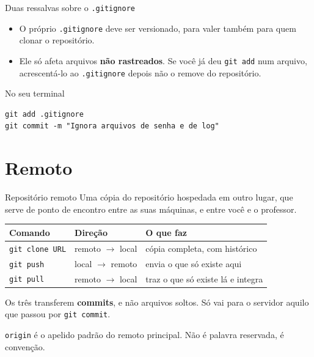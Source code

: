 \documentclass{beamer}
\newenvironment{noterminal}
  {\begin{exampleblock}{No seu terminal}}
  {\end{exampleblock}}
\begin{document}
\begin{frame}[fragile]{Duas ressalvas sobre o \texttt{.gitignore}}
  \begin{itemize}
    \item O próprio \texttt{.gitignore} deve ser versionado, para valer também
          para quem clonar o repositório.
    \item Ele só afeta arquivos \textbf{não rastreados}. Se você já deu
          \texttt{git add} num arquivo, acrescentá-lo ao \texttt{.gitignore}
          depois não o remove do repositório.
  \end{itemize}

  \vspace{0.4cm}
  \begin{noterminal}
    \begin{verbatim}
git add .gitignore
git commit -m "Ignora arquivos de senha e de log"
    \end{verbatim}
  \end{noterminal}
\end{frame}

\section{Remoto}

\begin{frame}[fragile]{Repositório remoto}
  Uma cópia do repositório hospedada em outro lugar, que serve de ponto de
  encontro entre as suas máquinas, e entre você e o professor.

  \vspace{0.3cm}
  \begin{center}
    \small
    \begin{tabular}{lll}
      \toprule
      \textbf{Comando} & \textbf{Direção} & \textbf{O que faz} \\
      \midrule
      \texttt{git clone URL} & remoto $\rightarrow$ local & cópia completa, com histórico \\
      \texttt{git push} & local $\rightarrow$ remoto & envia o que só existe aqui \\
      \texttt{git pull} & remoto $\rightarrow$ local & traz o que só existe lá e integra \\
      \bottomrule
    \end{tabular}
  \end{center}

  \vspace{0.3cm}
  Os três transferem \textbf{commits}, e não arquivos soltos. Só vai para o
  servidor aquilo que passou por \texttt{git commit}.

  \vspace{0.2cm}
  \footnotesize \texttt{origin} é o apelido padrão do remoto principal. Não é
  palavra reservada, é convenção.
\end{frame}
\end{document}
